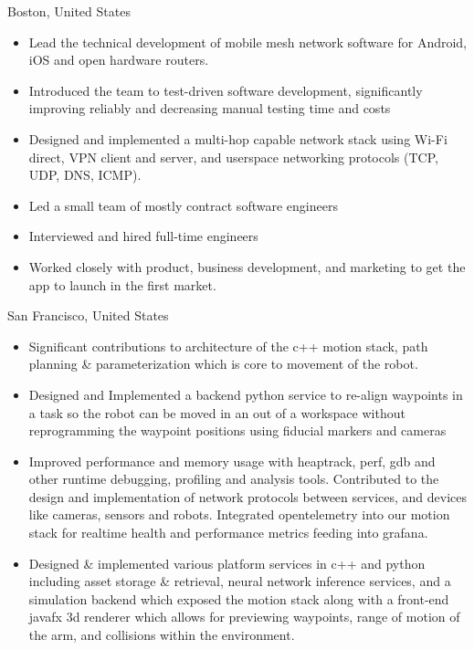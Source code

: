 \documentclass[10pt,a4paper,ragged2e,withhyper]{altacv}
\begin{document}
\begin{paracol}{2}

 {Boston, United States}
\begin{itemize}
\item Lead the technical development of mobile mesh network software for Android, iOS and open hardware routers.
\item Introduced the team to test-driven software development, significantly improving reliably and decreasing manual testing time and costs
\item Designed and implemented a multi-hop capable network stack using Wi-Fi direct, VPN client and server, and userspace networking protocols (TCP, UDP, DNS, ICMP).
\item Led a small team of mostly contract software engineers
\item Interviewed and hired full-time engineers
\item Worked closely with product, business development, and marketing to get the app to launch in the first market.
\end{itemize}

 {San Francisco, United States}
\begin{itemize}
\item Significant contributions to architecture of the c++ motion stack, path planning \& parameterization which is core to movement of the robot. 
\item Designed and Implemented a backend python service to re-align waypoints in a task so the robot can be moved in an out of a workspace without reprogramming the waypoint positions using fiducial markers and cameras
\item Improved performance and memory usage with heaptrack, perf, gdb and other runtime debugging, profiling and analysis tools. Contributed to the design and implementation of network protocols between services, and devices like cameras, sensors and robots. Integrated opentelemetry into our motion stack for realtime health and performance metrics feeding into grafana.
\item Designed \& implemented various platform services in c++ and python including asset storage \& retrieval, neural network inference services, and a simulation backend which exposed the motion stack along with a front-end javafx 3d renderer which allows for previewing waypoints, range of motion of the arm, and  collisions within the environment.
\end{itemize}


\end{paracol}
\end{document}
